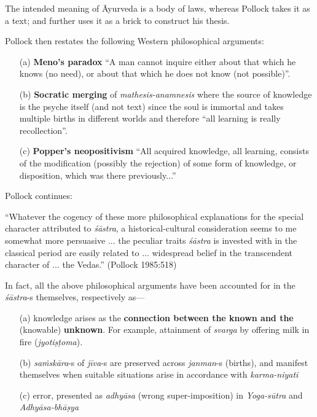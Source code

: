 The intended meaning of Āyurveda is a body of laws, whereas Pollock takes it as a text; and further uses it as a brick to construct his thesis. 

Pollock then restates the following Western philosophical arguments:
\begin{itemize}
\itemsep=1pt
\item[(a)] {\bf Meno's paradox}  ``A man cannot inquire either about that which he knows (no need), or about that which he does not know (not possible)''.

\item[(b)] {\bf Socratic merging} of {\sl mathesis-anamnesis} where the source of knowledge is the psyche itself (and not text) since the soul is immortal and takes multiple births in different worlds and therefore ``all learning is really recollection''.

\newpage

\item[(c)] {\bf Popper's neopositivism} ``All acquired knowledge, all learning, consists of the modiﬁcation (possibly the rejection) of some form of knowledge, or disposition, which was there previously...''
\end{itemize}
Pollock continues:
\begin{myquote}
``Whatever the cogency of these more philosophical explanations for the special character attributed to {\sl śāstra}, a historical-cultural consideration seems to me somewhat more persuasive ... the peculiar traits {\sl śāstra} is invested with in the classical period are easily related to ... widespread belief in the transcendent character of ... the Vedas.'' (Pollock 1985:518)
\end{myquote}

In fact, all the above philosophical arguments have been accounted for in the {\sl śāstra}-s themselves, respectively as---
\begin{itemize}
\itemsep=1pt
\item[(a)] knowledge arises as the {\bf connection between the known and the } (knowable) {\bf unknown}. For example, attainment of {\sl svarga} by offering milk in ﬁre ({\sl jyotiṣṭoma}).

\item[(b)] {\sl saṁskāra}-s of {\sl jīva}-s are preserved across {\sl janman}-s (births), and manifest themselves when suitable situations arise in accordance with {\sl karma-niyati}

\item[(c)] error, presented as {\sl adhyāsa} (wrong super-imposition) in {\sl Yoga-\break sūtra} and {\sl Adhyāsa-bhāṣya}
\end{itemize}


